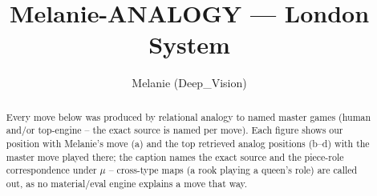\documentclass[11pt]{article}
\title{Melanie-ANALOGY — London System}
\author{Melanie (Deep\_Vision)}
\date{}
\begin{document}
\maketitle

\begin{abstract}Every move below was produced by relational analogy to named master games (human and/or top-engine -- the exact source is named per move). Each figure shows our position with Melanie's move (a) and the top retrieved analog positions (b--d) with the master move played there; the caption names the exact source and the piece-role correspondence under $\mu$ -- cross-type maps (a rook playing a queen's role) are called out, as no material/eval engine explains a move that way.\end{abstract}

\begin{figure}[p]\centering
\begin{subfigure}{0.46\textwidth}\centering
\resizebox{\linewidth}{!}{%
\newchessgame
\chessboard[
  setfen={rnbq1rk1/pp3ppp/3bpn2/2pp4/3P4/3BPNB1/PPP2PPP/RN1QK2R w KQ - 0 7},
  showmover=false,
  pgfstyle=straightmove, color=movearrow, markmove={e1-g1}
]}
\caption{}
\end{subfigure}\hfill
\begin{subfigure}{0.46\textwidth}\centering
\resizebox{\linewidth}{!}{%
\newchessgame
\chessboard[
  setfen={rn1qk2r/pb1pbppp/1p2pn2/2p5/3P4/1P1BPN2/PBP2PPP/RN1QK2R w KQkq - 4 7},
  showmover=false,
  pgfstyle=straightmove, color=movearrow, markmove={e1-g1}
]}
\caption{}
\end{subfigure}
\\[4pt]
\begin{subfigure}{0.46\textwidth}\centering
\resizebox{\linewidth}{!}{%
\newchessgame
\chessboard[
  setfen={rn1qk2r/pb1pbppp/1p2pn2/2p5/3P4/1P1BPN2/PBP2PPP/RN1QK2R w KQkq - 4 7},
  showmover=false,
  pgfstyle=straightmove, color=movearrow, markmove={e1-g1}
]}
\caption{}
\end{subfigure}\hfill
\begin{subfigure}{0.46\textwidth}\centering
\resizebox{\linewidth}{!}{%
\newchessgame
\chessboard[
  setfen={rn1qk2r/pbp2ppp/1p1bpn2/3p4/2PP4/1P1BPN2/P4PPP/RNBQ1RK1 b kq - 0 7},
  showmover=false,
  pgfstyle=straightmove, color=movearrow, markmove={e8-g8}
]}
\caption{}
\end{subfigure}

\end{figure}
\end{document}
